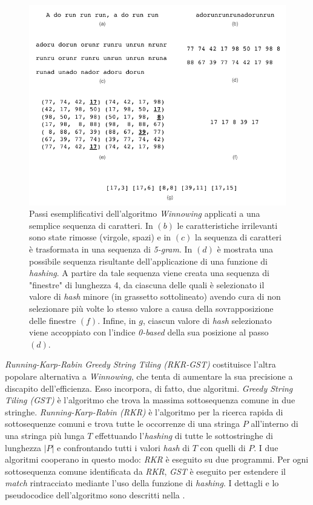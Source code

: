 \begin{figure}[h!]
    \centering
    \includegraphics[width=\textwidth]{resources/img/01-winnowing-example.pdf}
    \caption[Passi esemplificativi dell'algoritmo \textit{Winnowing} applicati a un semplice testo scritto in linguaggio naturale.]{Passi esemplificativi dell'algoritmo \textit{Winnowing} applicati a una semplice sequenza di caratteri. In $(b)$ le caratteristiche irrilevanti sono state rimosse (virgole, spazi) e in $(c)$ la sequenza di caratteri è trasformata in una sequenza di \textit{5-gram}. In $(d)$ è mostrata una possibile sequenza risultante dell'applicazione di una funzione di \textit{hashing}. A partire da tale sequenza viene creata una sequenza di "finestre" di lunghezza 4, da ciascuna delle quali è selezionato il valore di \textit{hash} minore (in grassetto sottolineato) avendo cura di non selezionare più volte lo stesso valore a causa della sovrapposizione delle finestre $(f)$. Infine, in $g$,  ciascun valore di \textit{hash} selezionato viene accoppiato con l'indice \textit{0-based} della sua posizione al passo $(d)$.}
    \label{img:01-winnowing-example}
\end{figure}

\textit{Running-Karp-Rabin Greedy String Tiling (RKR-GST)} costituisce l'altra popolare alternativa a \textit{Winnowing}, che tenta di aumentare la sua precisione a discapito dell'efficienza. 
%
Esso incorpora, di fatto, due algoritmi.
%
\textit{Greedy String Tiling (GST)} è l'algoritmo che trova la massima sottosequenza comune in due stringhe.
%
\textit{Running-Karp-Rabin (RKR)} è l'algoritmo per la ricerca rapida di sottosequenze comuni e trova tutte le occorrenze di una stringa $P$ all'interno di una stringa più lunga $T$ effettuando l'\textit{hashing} di tutte le sottostringhe di lunghezza $|P|$ e confrontando tutti i valori \textit{hash} di $T$ con quelli di $P$.
%
I due algoritmi cooperano in questo modo: \textit{RKR} è eseguito su due programmi.
%
Per ogni sottosequenza comune identificata da \textit{RKR}, \textit{GST} è eseguito per estendere il \textit{match} rintracciato mediante l'uso della funzione di \textit{hashing}.
%
I dettagli e lo pseudocodice dell'algoritmo sono descritti nella .

